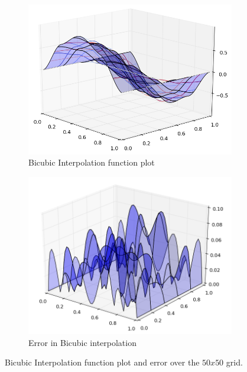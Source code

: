 \documentclass[11pt]{article}
\begin{document}
\begin{figure}
        \centering
        \begin{subfigure}{.5\textwidth}
  \centering
        \includegraphics[width=1\linewidth]{q8/cubic_func_5.png}
                \caption{Bicubic Interpolation function plot}
                \label{fig:q8_cubic_func}
                \end{subfigure}%
\begin{subfigure}{.5\textwidth}
  \centering
        \includegraphics[width=1\linewidth]{q8/cubic_err_5.png}
                \caption{Error in Bicubic interpolation}
                \label{fig:q8_cubic_err}
	\end{subfigure}
            
\caption{Bicubic Interpolation function plot and error over the $50x50$ grid.}
\label{fig:q8_cubic}        
\end{figure} 
\end{document}
